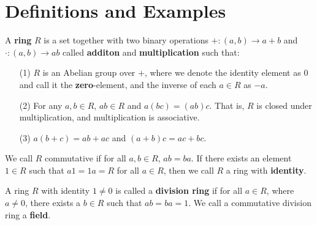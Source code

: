 \section{Definitions and Examples}
\label{section_5.1}

\begin{definition}
  A \textbf{ring} $R$ is a set together with two binary operations  $+:(a,b)
  \xrightarrow{} a+b$ and $\cdot:(a,b) \xrightarrow{} ab$ called
  \textbf{additon} and \textbf{multiplication} such that:
  \begin{enumerate}
    \item[(1)] $R$ is an Abelian group over $+$, where we denote the
      identity element as $0$ and call it the \textbf{zero}-element,
      and the inverse of each $a \in R$ as $-a$.

    \item[(2)] For any $a,b \in R$,  $ab \in R$ and $a(bc)=(ab)c$. That is,
      $R$ is closed under multiplication, and  multiplication is
      associative.

    \item[(3)] $a(b+c)=ab+ac$ and $(a+b)c=ac+bc$.
  \end{enumerate}
  We call $R$ commutative if for all $a,b \in R$, $ab=ba$. If there
  exists an element $1 \in R$ such that $a1=1a=R$ for all $a \in R$,
  then we call $R$ a ring with  \textbf{identity}.
\end{definition}

\begin{definition}
  A ring $R$ with identity $1 \neq 0$ is called a \textbf{division ring} if
  for all $a \in R$, where  $a \neq 0$, there exists a  $b \in R$ such that
  $ab=ba=1$. We call a commutative division ring a \textbf{field}.
\end{definition}

